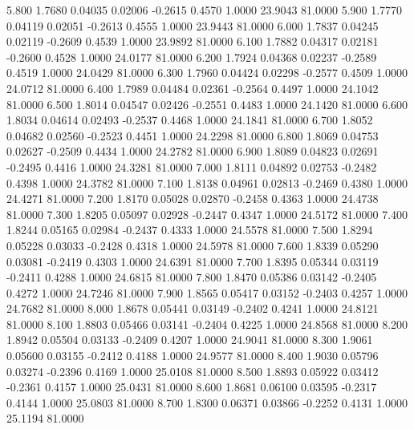    5.800   1.7680   0.04035   0.02006  -0.2615   0.4570   1.0000  23.9043  81.0000
   5.900   1.7770   0.04119   0.02051  -0.2613   0.4555   1.0000  23.9443  81.0000
   6.000   1.7837   0.04245   0.02119  -0.2609   0.4539   1.0000  23.9892  81.0000
   6.100   1.7882   0.04317   0.02181  -0.2600   0.4528   1.0000  24.0177  81.0000
   6.200   1.7924   0.04368   0.02237  -0.2589   0.4519   1.0000  24.0429  81.0000
   6.300   1.7960   0.04424   0.02298  -0.2577   0.4509   1.0000  24.0712  81.0000
   6.400   1.7989   0.04484   0.02361  -0.2564   0.4497   1.0000  24.1042  81.0000
   6.500   1.8014   0.04547   0.02426  -0.2551   0.4483   1.0000  24.1420  81.0000
   6.600   1.8034   0.04614   0.02493  -0.2537   0.4468   1.0000  24.1841  81.0000
   6.700   1.8052   0.04682   0.02560  -0.2523   0.4451   1.0000  24.2298  81.0000
   6.800   1.8069   0.04753   0.02627  -0.2509   0.4434   1.0000  24.2782  81.0000
   6.900   1.8089   0.04823   0.02691  -0.2495   0.4416   1.0000  24.3281  81.0000
   7.000   1.8111   0.04892   0.02753  -0.2482   0.4398   1.0000  24.3782  81.0000
   7.100   1.8138   0.04961   0.02813  -0.2469   0.4380   1.0000  24.4271  81.0000
   7.200   1.8170   0.05028   0.02870  -0.2458   0.4363   1.0000  24.4738  81.0000
   7.300   1.8205   0.05097   0.02928  -0.2447   0.4347   1.0000  24.5172  81.0000
   7.400   1.8244   0.05165   0.02984  -0.2437   0.4333   1.0000  24.5578  81.0000
   7.500   1.8294   0.05228   0.03033  -0.2428   0.4318   1.0000  24.5978  81.0000
   7.600   1.8339   0.05290   0.03081  -0.2419   0.4303   1.0000  24.6391  81.0000
   7.700   1.8395   0.05344   0.03119  -0.2411   0.4288   1.0000  24.6815  81.0000
   7.800   1.8470   0.05386   0.03142  -0.2405   0.4272   1.0000  24.7246  81.0000
   7.900   1.8565   0.05417   0.03152  -0.2403   0.4257   1.0000  24.7682  81.0000
   8.000   1.8678   0.05441   0.03149  -0.2402   0.4241   1.0000  24.8121  81.0000
   8.100   1.8803   0.05466   0.03141  -0.2404   0.4225   1.0000  24.8568  81.0000
   8.200   1.8942   0.05504   0.03133  -0.2409   0.4207   1.0000  24.9041  81.0000
   8.300   1.9061   0.05600   0.03155  -0.2412   0.4188   1.0000  24.9577  81.0000
   8.400   1.9030   0.05796   0.03274  -0.2396   0.4169   1.0000  25.0108  81.0000
   8.500   1.8893   0.05922   0.03412  -0.2361   0.4157   1.0000  25.0431  81.0000
   8.600   1.8681   0.06100   0.03595  -0.2317   0.4144   1.0000  25.0803  81.0000
   8.700   1.8300   0.06371   0.03866  -0.2252   0.4131   1.0000  25.1194  81.0000
